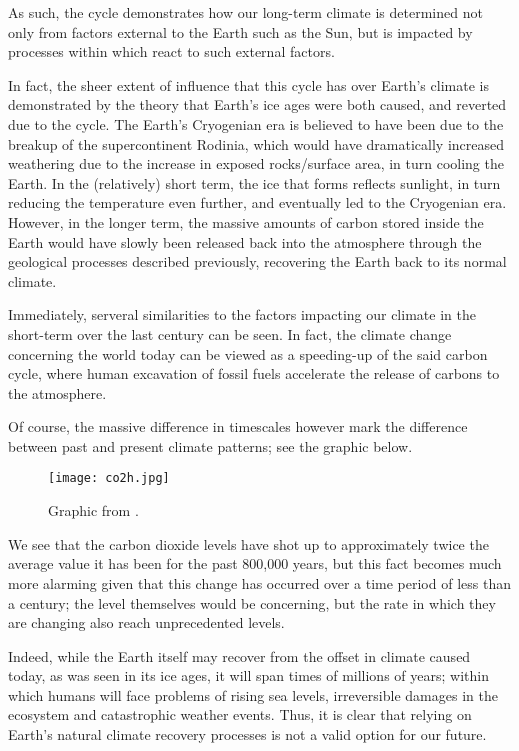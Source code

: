 \documentclass{article}
\theoremstyle{definition}
\begin{document}
As such, the cycle demonstrates how our long-term climate is determined not only from factors external to the Earth such as the Sun, but is impacted by processes within which react to such external factors.

In fact, the sheer extent of influence that this cycle has over Earth's climate is demonstrated by the theory that Earth's ice ages were both caused, and reverted due to the cycle. The Earth's Cryogenian era is believed to have been due to the breakup of the supercontinent Rodinia, which would have dramatically increased weathering due to the increase in exposed rocks/surface area, in turn cooling the Earth. In the (relatively) short term, the ice that forms reflects sunlight, in turn reducing the temperature even further, and eventually led to the Cryogenian era. However, in the longer term, the massive amounts of carbon stored inside the Earth would have slowly been released back into the atmosphere through the geological processes described previously, recovering the Earth back to its normal climate\cite{ash}.

Immediately, serveral similarities to the factors impacting our climate in the short-term over the last century can be seen. In fact, the climate change concerning the world today can be viewed as a speeding-up of the said carbon cycle, where human excavation of fossil fuels accelerate the release of carbons to the atmosphere.

Of course, the massive difference in timescales however mark the difference between past and present climate patterns; see the graphic below.
\begin{figure}[h]
	\centering
	\texttt{[image: co2h.jpg]}
	\caption{Graphic from \cite{co2}.}
\end{figure}
We see that the carbon dioxide levels have shot up to approximately twice the average value it has been for the past 800,000 years, but this fact becomes much more alarming given that this change has occurred over a time period of less than a century; the level themselves would be concerning, but the rate in which they are changing also reach unprecedented levels.\par

Indeed, while the Earth itself may recover from the offset in climate caused today, as was seen in its ice ages, it will span times of millions of years; within which humans will face problems of rising sea levels, irreversible damages in the ecosystem and catastrophic weather events. Thus, it is clear that relying on Earth's natural climate recovery processes is not a valid option for our future.

\newpage

\end{document}
